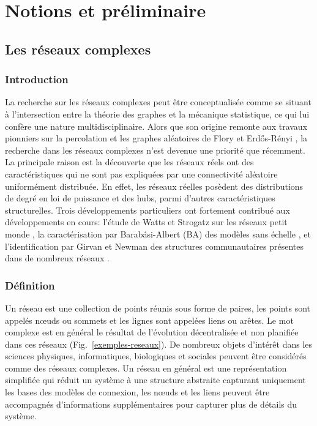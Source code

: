 
\chapter{Notions et préliminaire}
\begin{minipage}{\textwidth}
	\linespread{1.2}
	\minitoc
\end{minipage}

\section{Les réseaux complexes}

\subsection{Introduction}
 La recherche sur les réseaux complexes peut être conceptualisée comme se situant à l'intersection entre la théorie 
 des graphes et la mécanique statistique, ce qui lui confère une nature multidisciplinaire. Alors que 
 son origine remonte aux travaux pionniers sur la percolation et les graphes aléatoires de Flory \cite{Flory} et  Erd\H{o}s-Rényi \cite{Erdos-Renyi1959,Erdos-Renyi1960,Erdos-Renyi1961}, la recherche dans les réseaux complexes n'est 
 devenue une priorité que récemment. La principale raison  est la découverte que les réseaux réels ont des caractéristiques 
 qui ne sont pas expliquées par une connectivité aléatoire uniformément distribuée. En effet, les réseaux  
 réelles posèdent  des distributions de degré en loi de puissance et des hubs, parmi d'autres caractéristiques 
 structurelles. Trois développements particuliers ont fortement contribué aux 
 développements en cours: l'étude de Watts et Strogatz sur les réseaux petit monde \cite{WS1998}, la caractérisation par
 Barab\'{a}si-Albert (BA) des modèles sans échelle  \cite{BA1999}, et l'identification par Girvan et Newman des structures communautaires 
 présentes dans de nombreux réseaux \cite{Girvan}.
 \subsection{Définition}
  Un \textsf{réseau} est une collection de points réunis sous forme de paires, les points sont appelés nœuds ou sommets 
  et les lignes sont appelées liens ou arêtes. Le mot \textsf{complexe} est en général le résultat de  l'évolution 
  décentralisée et non planifiée dans ces réseaux (Fig.~\ref{exemples-reseaux}). De nombreux objets d'intérêt dans
  les sciences physiques, informatiques, biologiques et sociales peuvent être considérés comme des réseaux complexes. 
  Un réseau en général est une représentation simplifiée  qui réduit un système à une structure abstraite capturant 
  uniquement les bases des modèles de connexion, les nœuds  et les liens peuvent être accompagnés
  d'informations supplémentaires pour capturer plus de détails du système. 
  
